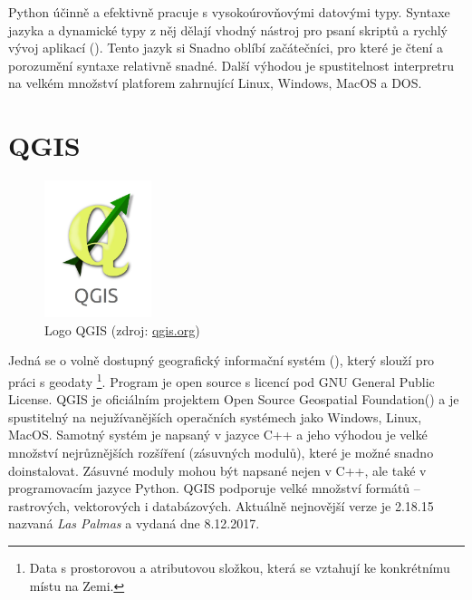 Python účinně a efektivně pracuje s vysokoúrovňovými datovými
typy. Syntaxe jazyka a dynamické typy z něj dělají vhodný nástroj pro
psaní skriptů a rychlý vývoj aplikací (). Tento jazyk si
Snadno oblíbí začátečníci, pro které je čtení a porozumění syntaxe
relativně snadné. Další výhodou je spustitelnost interpretru na velkém
množství platforem zahrnující Linux, Windows, MacOS a
DOS. \cite{ucebnicepython, python}

\section{QGIS}

\begin{figure}[H]
	 \centering
      \includegraphics[height=4cm]{./pictures/qgis-logo.jpg}
      \caption{Logo QGIS (zdroj:
\href{https://euipo.europa.eu/copla/image/CJ4JX4FZVCC523YA2TMALSKFLFPOWZHPVHYMP5QREVP2BOXHB3PCM7RCOZR6TEIMWNCQDAB6N25VA}{qgis.org})}
      \label{fig:qgis}
  \end{figure}
  
Jedná se o volně dostupný geografický informační systém (),
který slouží pro práci s geodaty \footnote{Data s prostorovou a
  atributovou složkou, která se vztahují ke konkrétnímu místu na
   Zemi.}. Program je open source s licencí pod GNU General Public
License. QGIS je oficiálním projektem Open Source Geospatial
Foundation() a je spustitelný na nejužívanějších operačních
systémech jako Windows, Linux, MacOS. Samotný systém je napsaný v
jazyce C++ a jeho výhodou je velké množství nejrůznějších rozšíření
(zásuvných modulů), které je možné snadno doinstalovat. Zásuvné moduly
mohou být napsané nejen v C++, ale také v programovacím jazyce
Python. QGIS podporuje velké množství formátů -- rastrových,
vektorových i databázových. Aktuálně nejnovější verze je 2.18.15
nazvaná \textit{Las Palmas} a vydaná dne 8.12.2017.

